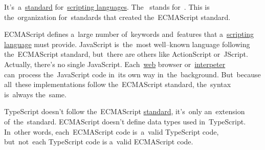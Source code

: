 \label{ecmascript}
It's~a~\hyperref[protocolstandard]{standard} for~\hyperref[scriptinglanguages]{scripting languages}.
The~ stands for~.
This is the~organization for~standards that created the~ECMAScript standard.

ECMAScript defines a~large number of~keywords and~features that a~\hyperref[scriptinglanguages]{scripting language} must provide.
JavaScript is~the~most well--known language following the~ECMAScript standard, but~there are others like ActionScript or~JScript.
Actually, there's no single JavaScript.
Each~\hyperref[internetweb]{web} browser or~\hyperref[compiledinterpretedlanguages]{interpeter} can~process the~JavaScript code in~its own way in~the~background.
But~because all~these implementations follow the~ECMAScript standard, the~syntax is~always the~same.

\warning TypeScript doesn't follow the~ECMAScript \hyperref[protocolstandard]{standard}, it's~only an~extension of~the~standard.
ECMAScript doesn't define data types used in~TypeScript.
In~other words, each~ECMAScript code is~a~valid TypeScript code, but~not~each TypeScript code is a~valid ECMAScript code.
